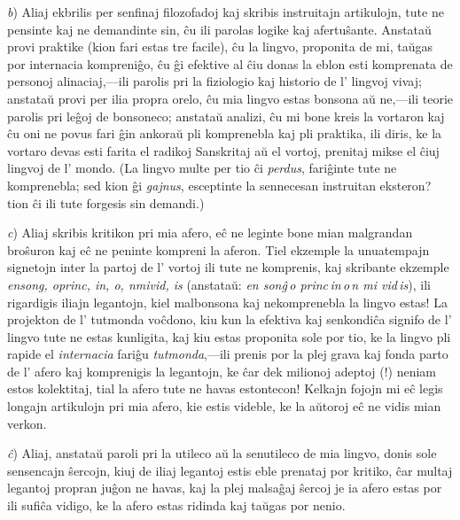 \emph{b}) Aliaj ekbrilis per senfinaj filozofadoj kaj skribis instruitajn artikulojn, tute ne pensinte kaj ne demandinte sin, ĉu ili parolas logike kaj afertuŝante. Anstataŭ provi praktike (kion fari estas tre facile), ĉu la lingvo, proponita de mi, taŭgas por internacia kompreniĝo, ĉu ĝi efektive al ĉiu donas la eblon esti komprenata de personoj alinaciaj,---ili parolis pri la fiziologio kaj historio de l' lingvoj vivaj; anstataŭ provi per ilia propra orelo, ĉu mia lingvo estas bonsona aŭ ne,---ili teorie parolis pri leĝoj de bonsoneco; anstataŭ analizi, ĉu mi bone kreis la vortaron kaj ĉu oni ne povus fari ĝin ankoraŭ pli komprenebla kaj pli praktika, ili diris, ke la vortaro devas esti farita el radikoj Sanskritaj aŭ el vortoj, prenitaj mikse el ĉiuj lingvoj de l' mondo. (La lingvo multe per tio ĉi \emph{perdus}, fariĝinte tute ne komprenebla; sed kion ĝi \emph{gajnus}, esceptinte la sennecesan instruitan eksteron? tion ĉi ili tute forgesis sin demandi.)

\emph{c}) Aliaj skribis kritikon pri mia afero, eĉ ne leginte bone mian malgrandan broŝuron kaj eĉ ne peninte kompreni la aferon. Tiel ekzemple la unuatempajn signetojn inter la partoj de l' vortoj ili tute ne komprenis, kaj skribante ekzemple \emph{\glqq{}ensong, oprinc, in, o, nmivid, is\grqq{}} (anstataŭ: \emph{\glqq{}en sonĝ\,o princ\,in\,o\,n mi vid\,is\grqq{}}), ili rigardigis iliajn legantojn, \glqq{}kiel malbonsona kaj nekomprenebla la lingvo estas\grqq{}! La projekton de l' tutmonda voĉdono, kiu kun la efektiva kaj senkondiĉa signifo de l' lingvo tute ne estas kunligita, kaj kiu estas proponita sole por tio, ke la lingvo pli rapide el \emph{internacia} fariĝu \emph{tutmonda},---ili prenis por la plej grava kaj fonda parto de l' afero kaj komprenigis la legantojn, ke \glqq{}ĉar dek milionoj adeptoj (!) neniam estos kolektitaj, tial la afero tute ne havas estontecon\grqq{}! Kelkajn fojojn mi eĉ legis longajn artikulojn pri mia afero, kie estis videble, ke la aŭtoroj eĉ ne vidis mian verkon.

\emph{ĉ}) Aliaj, anstataŭ paroli pri la utileco aŭ la senutileco de mia lingvo, donis sole sensencajn ŝercojn, kiuj de iliaj legantoj estis eble prenataj por kritiko, ĉar multaj legantoj propran juĝon ne havas, kaj la plej malsaĝaj ŝercoj je ia afero estas por ili sufiĉa vidigo, ke la afero estas \glqq{}ridinda\grqq{} kaj taŭgas por nenio.

